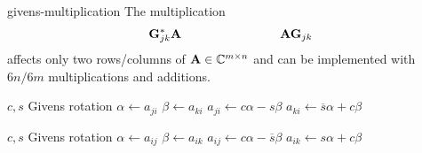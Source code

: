 \begin{Algorithm}{givens-multiplication}
  The multiplication
  \begin{gather}
    \mathbf G_{jk}^*\mathbf A\qquad\qquad\qquad\qquad \mathbf A\mathbf G_{jk}
  \end{gather}
  affects only two rows/columns of $\mathbf A\in\mathbb C^{m\times n}$ and can be
  implemented with $6n/6m$ multiplications and additions.

  \hrulefill
  \vspace*{2mm}

  \begin{minipage}{.49\textwidth}
    \begin{algorithmic}[1]
      \Require $c,s$ Givens rotation
      \State $\alpha \gets a_{ji}$
      \State $\beta \gets a_{ki}$
      \State $a_{ji} \gets c\alpha-s\beta$
      \State $a_{ki} \gets \overline{s}\alpha+c\beta$
      \EndFor
    \end{algorithmic}
  \end{minipage}
  \begin{minipage}{.49\textwidth}
    \begin{algorithmic}[1]
      \Require $c,s$ Givens rotation
      \State $\alpha \gets a_{ij}$
      \State $\beta \gets a_{ik}$
      \State $a_{ij} \gets c\alpha-\overline{s}\beta$
      \State $a_{ik} \gets s\alpha+c\beta$
      \EndFor
    \end{algorithmic}
  \end{minipage}
\end{Algorithm}

